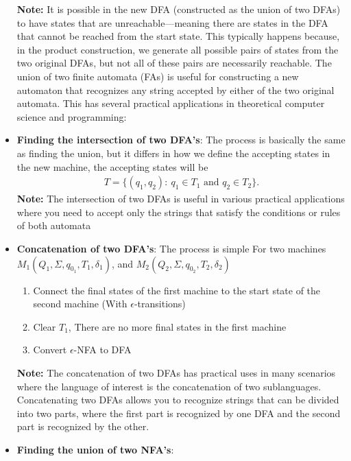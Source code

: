 \documentclass{report}
\begin{document}
\begin{itemize}
        \bigbreak \noindent 
        \textbf{Note:} It is possible in the new DFA (constructed as the union of two DFAs) to have states that are unreachable—meaning there are states in the DFA that cannot be reached from the start state. This typically happens because, in the product construction, we generate all possible pairs of states from the two original DFAs, but not all of these pairs are necessarily reachable.
        \bigbreak \noindent 
        The union of two finite automata (FAs) is useful for constructing a new automaton that recognizes any string accepted by either of the two original automata. This has several practical applications in theoretical computer science and programming:
    \item \textbf{Finding the intersection of two DFA's}: The process is basically the same as finding the union, but it differs in how we define the accepting states in the new machine, the accepting states will be
        \begin{align*}
            T = \{(q_{1},q_{2}):\ q_{1} \in T_{1} \text{ and } q_{2} \in T_{2}\}
        .\end{align*}
        \bigbreak \noindent 
        \textbf{Note:} The intersection of two DFAs is useful in various practical applications where you need to accept only the strings that satisfy the conditions or rules of both automata
    \item \textbf{Concatenation of two DFA's}: The process is simple
        \bigbreak \noindent 
        For two machines $M_{1}(Q_{1}, \Sigma, q_{0_{1}}, T_{1}, \delta_{1})$, and $M_{2}(Q_{2}, \Sigma, q_{0_{2}}, T_{2}, \delta_{2})$ 
        \begin{enumerate}
            \item Connect the final states of the first machine to the start state of the second machine (With $\epsilon$-transitions)
            \item Clear $T_{1}$, There are no more final states in the first machine
            \item Convert $\epsilon$-NFA to DFA
        \end{enumerate}
        \textbf{Note:} The concatenation of two DFAs has practical uses in many scenarios where the language of interest is the concatenation of two sublanguages. Concatenating two DFAs allows you to recognize strings that can be divided into two parts, where the first part is recognized by one DFA and the second part is recognized by the other.
    \item \textbf{Finding the union of two NFA's}:

\end{itemize}
\end{document}

